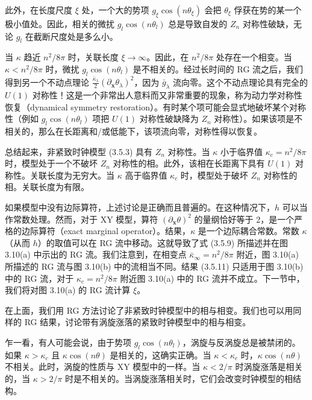 此外，在长度尺度 $\xi$ 处，一个大的势项 $g_\xi\cos(n\theta_\xi)$ 会把 $\theta_\xi$ 俘获在势的某一个极小值处。因此，相关的微扰 $g_l\cos(n\theta_l)$ 总是导致自发的 $Z_n$ 对称性破缺，无论 $g_l$ 在截断尺度处是多么小。

当 $\kappa$ 趋近 $n^2/8\pi$ 时，关联长度 $\xi \to \infty$。因此，在 $n^2/8\pi$ 处存在一个相变。当 $\kappa < n^2/8\pi$ 时，微扰 $g_l\cos(n\theta_l)$ 是不相关的。经过长时间的 RG 流之后，我们得到另一个不动点理论 $\frac{\bar{\kappa}_\lambda}{2}(\partial_{\pmb{x}}\theta_\lambda)^2$，因为 $\bar{g}_\lambda$ 流向零。这个不动点理论具有完全的 $U(1)$ 对称性！这是一个非常出人意料而又非常重要的现象，称为动力学对称性恢复（dynamical symmetry restoration）。有时某个项可能会显式地破坏某个对称性（例如 $g_l\cos(n\theta_l)$ 项把 $U(1)$ 对称性破缺降为 $Z_n$ 对称性）。如果该项是不相关的，那么在长距离和/或低能下，该项流向零，对称性得以恢复。

总结起来，非紧致时钟模型 (3.5.3) 具有 $Z_n$ 对称性。当 $\kappa$ 小于临界值 $\kappa_c = n^2/8\pi$ 时，模型处于一个不破坏 $Z_n$ 对称性的相。此外，该相在长距离下具有 $U(1)$ 对称性。关联长度为无穷大。当 $\kappa$ 高于临界值 $\kappa_c$ 时，模型处于破坏 $Z_n$ 对称性的相。关联长度为有限。

如果模型中没有边际算符，上述讨论是正确而且普遍的。在这种情况下，$h$ 可以当作常数处理。然而，对于 XY 模型，算符 $(\partial_{\pmb{x}}\theta)^2$ 的量纲恰好等于 2，是一个严格的边际算符（exact marginal operator）。结果，$\kappa$ 是一个边际耦合常数。常数 $\kappa$（从而 $h$）的取值可以在 RG 流中移动。这就导致了式 (3.5.9) 所描述并在图 3.10(a) 中示出的 RG 流。我们注意到，在相变点 $\bar{\kappa}_\infty = n^2/8\pi$ 附近，图 3.10(a) 所描述的 RG 流与图 3.10(b) 中的流相当不同。结果 (3.5.11) 只适用于图 3.10(b) 中的 RG 流，对于 $\kappa_c = n^2/8\pi$ 附近图 3.10(a) 中的 RG 流并不成立。下一节中，我们将对图 3.10(a) 的 RG 流计算 $\xi$。

在上面，我们用 RG 方法讨论了非紧致时钟模型中的相与相变。我们也可以用同样的 RG 结果，讨论带有涡旋涨落的紧致时钟模型中的相与相变。

乍一看，有人可能会说，由于势项 $g_l\cos(n\theta_l)$，涡旋与反涡旋总是被禁闭的。如果 $\kappa > \kappa_c$ 且 $\kappa\cos(n\theta)$ 是相关的，这确实正确。当 $\kappa < \kappa_c$ 时，$\kappa\cos(n\theta)$ 不相关。此时，涡旋的性质与 XY 模型中的一样。当 $\kappa < 2/\pi$ 时涡旋涨落是相关的，当 $\kappa > 2/\pi$ 时是不相关的。当涡旋涨落相关时，它们会改变时钟模型的相结构。

